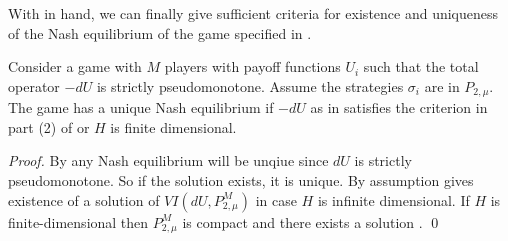 With  in hand, we can finally give sufficient criteria for existence and uniqueness of the Nash equilibrium of the game specified in .
\begin{theorem} \label{thm:nash_unique}
  Consider a game with $M$ players with payoff functions $U_i$ such that the total operator $-dU$ is strictly pseudomonotone. Assume the strategies $\sigma_i$ are in $P_{2,\mu}$. The game has a unique Nash equilibrium if $-dU$ as in  satisfies the criterion in part (2) of  or $H$ is finite dimensional.
\end{theorem}
\begin{proof}
    By  any Nash equilibrium will be unqiue since $dU$ is strictly pseudomonotone. So if the solution exists, it is unique. By assumption  gives existence of a solution of $VI(dU,P_{2,\mu}^M)$ in case $H$ is infinite dimensional. If $H$ is finite-dimensional then $P_{2,\mu}^M$ is compact and there exists a solution . \qed
\end{proof}

